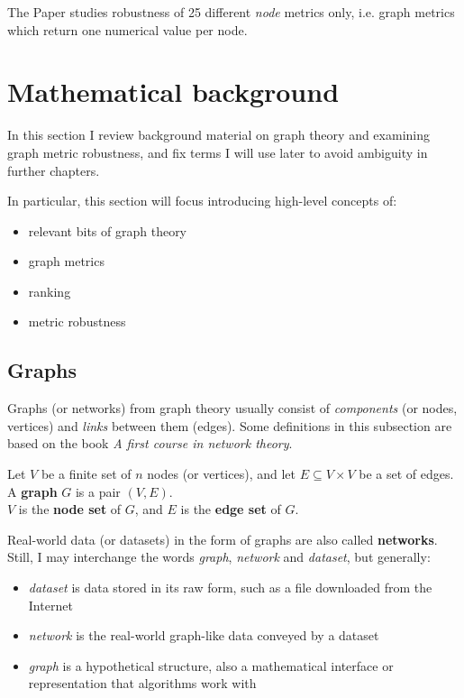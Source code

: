 The Paper studies robustness of 25 different \textsl{node} metrics only, i.e. graph metrics which return one numerical value per node.


\section{Mathematical background}\label{sec:math_background}

In this section I review background material on graph theory and examining graph metric robustness, and fix terms I will use later to avoid ambiguity in further chapters.

In particular, this section will focus introducing high-level concepts of:
\begin{itemize}
    \item relevant bits of graph theory
    \item graph metrics
    \item ranking
    \item metric robustness
\end{itemize}

\subsection{Graphs}

Graphs (or networks) from graph theory usually consist of \textit{components} (or nodes, vertices) and \textit{links} between them (edges).
Some definitions in this subsection are based on the book \textsl{A first course in network theory}\cite{Estrada2017}.

\begin{definition}[Graph]
    Let $V$ be a finite set of $n$ nodes (or vertices), and let $E \subseteq V \times V$ be a set of edges.\\
    A \textbf{graph} $G$ is a pair $(V, E)$.\\
    $V$ is the \textbf{node set} of $G$, and $E$ is the \textbf{edge set} of $G$.
\end{definition}

Real-world data (or datasets) in the form of graphs are also called \textbf{networks}.
Still, I may interchange the words \textsl{graph}, \textsl{network} and \textsl{dataset}, but generally:
\begin{itemize}
    \item \textsl{dataset} is data stored in its raw form, such as a file downloaded from the Internet
    \item \textsl{network} is the real-world graph-like data conveyed by a dataset
    \item \textsl{graph} is a hypothetical structure, also a mathematical interface or representation that algorithms work with
\end{itemize}


